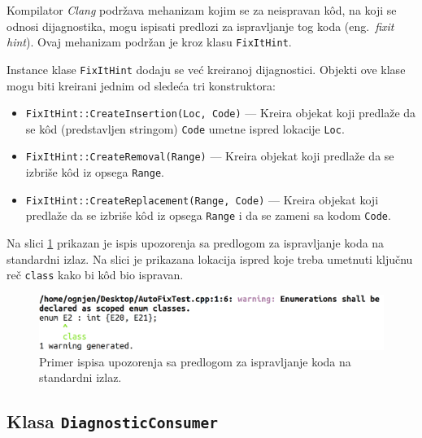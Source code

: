 \documentclass[12pt,oneside]{memoir}
\begin{document}
Kompilator \textit{Clang} podr\v{z}ava mehanizam kojim se za neispravan k\^{o}d, na koji se odnosi dijagnostika, mogu ispisati predlozi za ispravljanje tog koda (eng.~\textit{fixit hint}). Ovaj mehanizam podr\v{z}an je kroz klasu \texttt{FixItHint}.
\par
Instance klase \texttt{FixItHint} dodaju se ve\'{c} kreiranoj dijagnostici. Objekti ove
klase mogu biti kreirani jednim od slede\'{c}a tri konstruktora:

\begin{itemize}
\item \texttt{FixItHint::CreateInsertion(Loc, Code)} --- Kreira objekat koji predla\v{z}e da se k\^{o}d (predstavljen stringom) \texttt{Code} umetne ispred lokacije \texttt{Loc}.
\item \texttt{FixItHint::CreateRemoval(Range)} --- Kreira objekat koji predla\v{z}e da se izbri\v{s}e k\^{o}d iz opsega \texttt{Range}.
\item \texttt{FixItHint::CreateReplacement(Range, Code)} --- Kreira objekat koji predla\v{z}e da se izbri\v{s}e k\^{o}d iz opsega \texttt{Range} i da se zameni sa kodom \texttt{Code}.
\end{itemize}

Na slici \ref{fig:fixit} prikazan je ispis upozorenja sa predlogom za ispravljanje koda na standardni izlaz. Na slici je prikazana lokacija
ispred koje treba umetnuti klju\v{c}nu re\v{c} \texttt{class} kako bi k\^{o}d bio ispravan.

\begin{figure}[!h]
\begin{center}
\includegraphics[scale=0.225]{fixit.png}
\end{center}
\caption{Primer ispisa upozorenja sa predlogom za ispravljanje koda na standardni izlaz.}
\label{fig:fixit}
\end{figure}

\subsection{Klasa \texttt{DiagnosticConsumer}}
\end{document}
